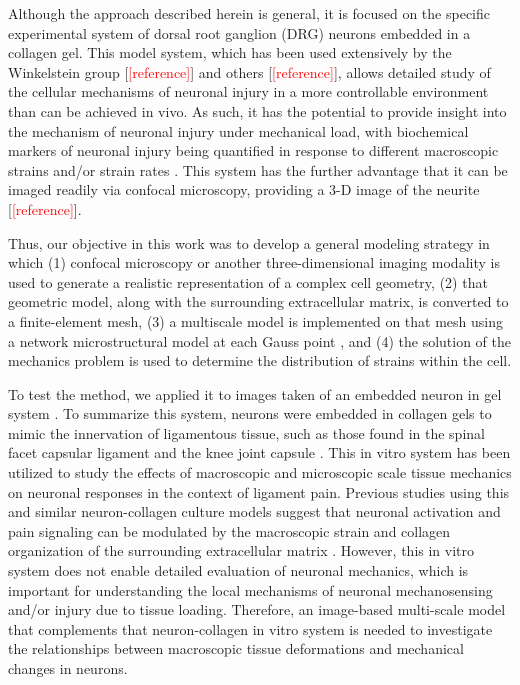 \documentclass[]{interact}
\newcommand{\red}[1]{\textcolor{red}{[#1]}}
\begin{document}
Although the approach described herein is general, it is focused on the specific experimental system of dorsal root ganglion (DRG) neurons embedded in a collagen gel. This model system, which has been used extensively by the Winkelstein group [\red{reference}] and others [\red{reference}], allows detailed study of the cellular mechanisms of neuronal injury in a more controllable environment than can be achieved in vivo. As such, it has the potential to provide insight into the mechanism of neuronal injury under mechanical load, with biochemical markers of neuronal injury being quantified in response to different macroscopic strains and/or strain rates \citep{Zhang:2016ga}. This system has the further advantage that it can be imaged readily via confocal microscopy, providing a 3-D image of the neurite [\red{reference}].

Thus, our objective in this work was to develop a general modeling strategy in which (1) confocal microscopy or another three-dimensional imaging modality is used to generate a realistic representation of a complex cell geometry, (2) that geometric model, along with the surrounding extracellular matrix, is converted to a finite-element mesh, (3) a multiscale model is implemented on that mesh using a network microstructural model at each Gauss point \citep{Chandran:2007hy,Stylianopoulos:2007dp}, and (4) the solution of the mechanics problem is used to determine the distribution of strains within the cell. 

To test the method, we applied it to images taken of an embedded neuron in gel system \citep{Zhang:2016ga}. To summarize this system, neurons were embedded in collagen gels to mimic the innervation of ligamentous tissue, such as those found in the spinal facet capsular ligament \citep{McLain1998RF,Kallakuri:2012ib} and the knee joint capsule \citep{Schultz1984RA,Khalsa:CKPnLlfY}. This in vitro system has been utilized to study the effects of macroscopic and microscopic scale tissue mechanics on neuronal responses in the context of ligament pain. Previous studies using this and similar neuron-collagen culture models suggest that neuronal activation and pain signaling can be modulated by the macroscopic strain and collagen organization of the surrounding extracellular matrix \citep{Zhang:2016ga, Zhang2017S}. However, this in vitro system does not enable detailed evaluation of neuronal mechanics, which is important for understanding the local mechanisms of neuronal mechanosensing and/or injury due to tissue loading. Therefore, an image-based multi-scale model that complements that neuron-collagen in vitro system is needed to investigate the relationships between macroscopic tissue deformations and mechanical changes in neurons. 
\end{document}
